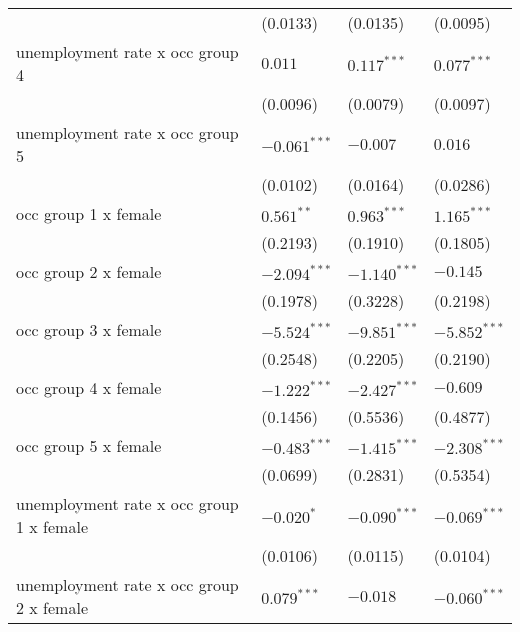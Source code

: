 \begin{tabular}{llll}
                                         &           (0.0133) &           (0.0135) &           (0.0095) \\
unemployment rate x occ group 4          &            $0.011$ &      $0.117^{***}$ &      $0.077^{***}$ \\
                                         &           (0.0096) &           (0.0079) &           (0.0097) \\
unemployment rate x occ group 5          &     $-0.061^{***}$ &           $-0.007$ &            $0.016$ \\
                                         &           (0.0102) &           (0.0164) &           (0.0286) \\
occ group 1 x female                     &       $0.561^{**}$ &      $0.963^{***}$ &      $1.165^{***}$ \\
                                         &           (0.2193) &           (0.1910) &           (0.1805) \\
occ group 2 x female                     &     $-2.094^{***}$ &     $-1.140^{***}$ &           $-0.145$ \\
                                         &           (0.1978) &           (0.3228) &           (0.2198) \\
occ group 3 x female                     &     $-5.524^{***}$ &     $-9.851^{***}$ &     $-5.852^{***}$ \\
                                         &           (0.2548) &           (0.2205) &           (0.2190) \\
occ group 4 x female                     &     $-1.222^{***}$ &     $-2.427^{***}$ &           $-0.609$ \\
                                         &           (0.1456) &           (0.5536) &           (0.4877) \\
occ group 5 x female                     &     $-0.483^{***}$ &     $-1.415^{***}$ &     $-2.308^{***}$ \\
                                         &           (0.0699) &           (0.2831) &           (0.5354) \\
unemployment rate x occ group 1 x female &         $-0.020^*$ &     $-0.090^{***}$ &     $-0.069^{***}$ \\
                                         &           (0.0106) &           (0.0115) &           (0.0104) \\
unemployment rate x occ group 2 x female &      $0.079^{***}$ &           $-0.018$ &     $-0.060^{***}$ \\

\end{tabular}
